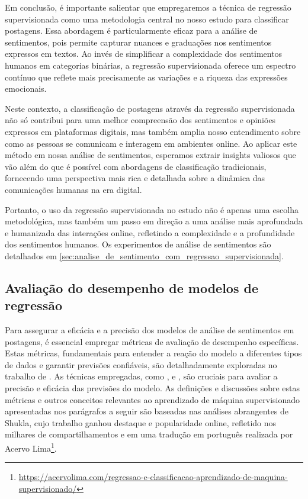 Em conclusão, é importante salientar que empregaremos a técnica de regressão supervisionada como uma metodologia central no nosso estudo para classificar postagens. Essa abordagem é particularmente eficaz para a análise de sentimentos, pois permite capturar nuances e graduações nos sentimentos expressos em textos. Ao invés de simplificar a complexidade dos sentimentos humanos em categorias binárias, a regressão supervisionada oferece um espectro contínuo que reflete mais precisamente as variações e a riqueza das expressões emocionais.

Neste contexto, a classificação de postagens através da regressão supervisionada não só contribui para uma melhor compreensão dos sentimentos e opiniões expressos em plataformas digitais, mas também amplia nosso entendimento sobre como as pessoas se comunicam e interagem em ambientes online. Ao aplicar este método em nossa análise de sentimentos, esperamos extrair insights valiosos que vão além do que é possível com abordagens de classificação tradicionais, fornecendo uma perspectiva mais rica e detalhada sobre a dinâmica das comunicações humanas na era digital.

Portanto, o uso da regressão supervisionada no estudo não é apenas uma escolha metodológica, mas também um passo em direção a uma análise mais aprofundada e humanizada das interações online, refletindo a complexidade e a profundidade dos sentimentos humanos. Os experimentos de análise de sentimentos são detalhados em \autoref{sec:analise_de_sentimento_com_regressao_supervisionada}.

\subsection{Avaliação do desempenho de modelos de regressão}

Para assegurar a eficácia e a precisão dos modelos de análise de sentimentos em postagens, é essencial empregar métricas de avaliação de desempenho específicas. Estas métricas, fundamentais para entender a reação do modelo a diferentes tipos de dados e garantir previsões confiáveis, são detalhadamente exploradas no trabalho de . As técnicas empregadas, como ,  e , são cruciais para avaliar a precisão e eficácia das previsões do modelo. As definições e discussões sobre estas métricas e outros conceitos relevantes ao aprendizado de máquina supervisionado apresentadas nos parágrafos a seguir são baseadas nas análises abrangentes de Shukla, cujo trabalho ganhou destaque e popularidade online, refletido nos milhares de compartilhamentos e em uma tradução em português realizada por Acervo Lima\footnote{\url{https://acervolima.com/regressao-e-classificacao-aprendizado-de-maquina-supervisionado/}}.


